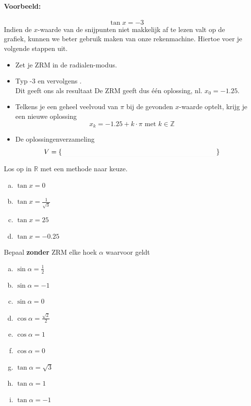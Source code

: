 \documentclass[a4paper,12pt]{article}
\begin{document}
\paragraph*{Voorbeeld:}
$$\tan x = -3$$
Indien de $x$-waarde van de snijpunten niet makkelijk af te lezen valt op de grafiek, kunnen we beter gebruik maken van onze rekenmachine.
Hiertoe voer je volgende stappen uit.
\begin{itemize}
  \item Zet je ZRM in de radialen-modus.
  \item Typ -3 en vervolgens  .\\
  Dit geeft ons als resultaat \arulefill
  De ZRM geeft dus één oplossing, nl. $x_{0}=-1.25$. 
  \item Telkens je een geheel veelvoud van $\pi$ bij de gevonden $x$-waarde optelt, krijg je een nieuwe oplossing
  $$x_k=-1.25+k\cdot\pi \mbox{ met } k \in \mathbb{Z}$$
  \item De oplossingenverzameling
  $$V = \{\arule{8cm}\}$$
\end{itemize}

\begin{oefening}
Los op in $\mathbb{R}$ met een methode naar keuze.
\begin{enumerate}[(a)]
  \item $\tan x=0$
  \item $\tan x=\frac{1}{\sqrt{3}}$
  \item $\tan x=25$
  \item $\tan x=-0.25$
\end{enumerate}
\end{oefening}

\begin{oefening}
Bepaal \textbf{zonder} ZRM elke hoek $\alpha$ waarvoor geldt
\begin{enumerate}[(a)]
  \item $\sin\alpha=\frac{1}{2}$
  \item $\sin\alpha=-1$
  \item $\sin\alpha=0$
  \item $\cos\alpha=\frac{\sqrt{2}}{2}$
  \item $\cos\alpha=1$
  \item $\cos\alpha=0$
  \item $\tan\alpha=\sqrt{3}$
  \item $\tan\alpha=1$
  \item $\tan\alpha=-1$
\end{enumerate}
\end{oefening}
\end{document}
